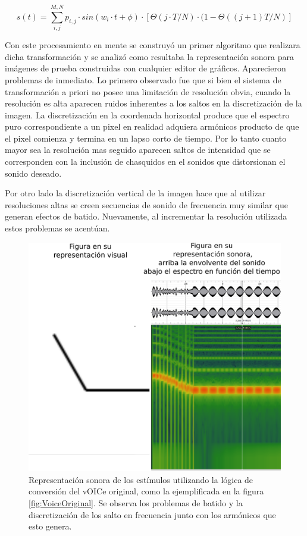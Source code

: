 \documentclass{article}
\begin{document}
    \begin{equation}
        \label{ec:VoiceOriginal}
        s(t) = \sum_{i,j}^{M,N} p_{i,j} \cdot sin(w_i \cdot t + \phi) \cdot [\Theta(j \cdot T/N) \cdot (1-\Theta((j+1)T/N)]
    \end{equation}

    Con este procesamiento en mente se construyó un primer algoritmo que realizara dicha transformación y se analizó como resultaba la representación sonora para imágenes de prueba construidas con cualquier editor de gráficos. Aparecieron problemas de inmediato. Lo primero observado fue que si bien el sistema de transformación a priori no posee una limitación de resolución obvia, cuando la resolución es alta aparecen ruidos inherentes a los saltos en la discretización de la imagen. La discretización en la coordenada horizontal produce que el espectro puro correspondiente a un pixel en realidad adquiera armónicos producto de que el pixel comienza y termina en un lapso corto de tiempo. Por lo tanto cuanto mayor sea la resolución mas seguido aparecen saltos de intensidad que se corresponden con la inclusión de chasquidos en el sonidos que distorsionan el sonido deseado. 
    
    Por otro lado la discretización vertical de la imagen hace que al utilizar resoluciones altas se creen secuencias de sonido de frecuencia muy similar que generan efectos de batido. Nuevamente, al incrementar la resolución utilizada estos problemas se acentúan. 
    
    
    \begin{figure}
        \center
        \includegraphics[width=\textwidth]{Imagenes/vOICeOriginal.png}
        \caption{Representación sonora de los estímulos utilizando la lógica de conversión del vOICe original, como la ejemplificada en la figura \ref{fig:VoiceOriginal}. Se observa los problemas de batido y la discretización de los salto en frecuencia junto con los armónicos que esto genera.}
        \label{fig:vOICeOriginal}
    \end{figure}
    
\end{document}
